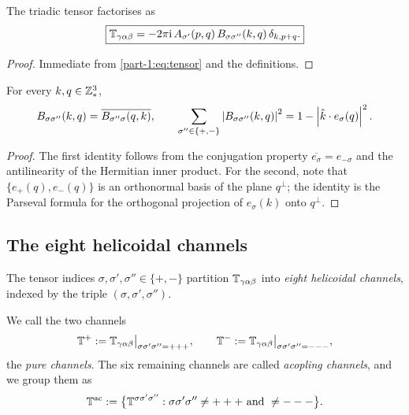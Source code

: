 \begin{proposition}[Factorisation]\label{part-1:prop:factorisation}
The triadic tensor factorises as
\begin{equation}\label{part-1:eq:factorisation}
\boxed{
\mathbb{T}_{\gamma\alpha\beta}
= -2\pi\mathrm{i}\, A_{\sigma'}(p,q)\, B_{\sigma\sigma''}(k,q)\, 
\delta_{k,p+q}.
}
\end{equation}
\end{proposition}

\begin{proof}
Immediate from \eqref{part-1:eq:tensor} and the definitions.
\end{proof}

\begin{lemma}
\label{part-1:lem:transition-symbol}
For every $k,q\in\mathbb{Z}^3_\ast$,
\begin{equation}\label{part-1:eq:B-hermitian}
B_{\sigma\sigma''}(k,q) = \overline{B_{\sigma''\sigma}(q,k)},
\qquad
\sum_{\sigma''\in\{+,-\}} \left\lvert B_{\sigma\sigma''}(k,q) \right\rvert^2 
= 1 - \left\lvert \hat k\cdot e_\sigma(q) \right\rvert^2.
\end{equation}
\end{lemma}

\begin{proof}
The first identity follows from the conjugation property 
$\overline{e_\sigma} = e_{-\sigma}$ and the antilinearity of the 
Hermitian inner product. For the second, note that 
$\{e_+(q),e_-(q)\}$ is an orthonormal basis of the plane 
$q^\perp$; the identity is the Parseval formula for the orthogonal 
projection of $e_\sigma(k)$ onto $q^\perp$.
\end{proof}

\subsection{The eight helicoidal channels}
\label{part-1:ssec:channels}

The tensor indices $\sigma,\sigma',\sigma''\in\{+,-\}$ partition 
$\mathbb{T}_{\gamma\alpha\beta}$ into \emph{eight helicoidal channels}, 
indexed by the triple $(\sigma,\sigma',\sigma'')$.

\begin{definition}[Channels]\label{part-1:def:channels}
We call the two channels
\begin{equation}\label{part-1:eq:pure-channels}
\mathbb{T}^+ := \mathbb{T}_{\gamma\alpha\beta}\big|_{\sigma\sigma'\sigma'' = +++},
\qquad
\mathbb{T}^- := \mathbb{T}_{\gamma\alpha\beta}\big|_{\sigma\sigma'\sigma'' = ---},
\end{equation}
the \emph{pure channels}. The six remaining channels are called 
\emph{acopling channels}, and we group them as
\begin{equation}\label{part-1:eq:ac-channels}
\mathbb{T}^{\mathrm{ac}} 
:= \bigl\{\mathbb{T}^{\sigma\sigma'\sigma''} : \sigma\sigma'\sigma'' \neq +++ \text{ and } \neq ---\bigr\}.
\end{equation}
\end{definition}

